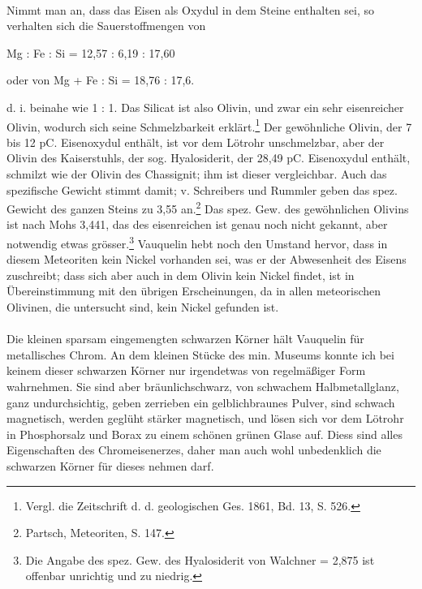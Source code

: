\documentclass[a4paper, 11pt, oneside]{article}
\begin{document}
\paragraph{}
Nimmt man an, dass das Eisen als Oxydul in dem Steine enthalten sei, so verhalten sich die Sauerstoffmengen von
\begin{center}
Mg : Fe : Si = 12,57 : 6,19 : 17,60 
\end{center}
\begin{center}
oder von Mg + Fe : Si = 18,76 : 17,6.
\end{center}
d. i. beinahe wie 1 : 1. Das Silicat ist also Olivin, und zwar ein sehr eisenreicher Olivin, wodurch sich seine Schmelzbarkeit erklärt.\footnote{Vergl. die Zeitschrift d. d. geologischen Ges. 1861, Bd. 13, S. 526.} Der gewöhnliche Olivin, der 7 bis 12 pC. Eisenoxydul enthält, ist vor dem Lötrohr unschmelzbar, aber der Olivin des Kaiserstuhls, der sog. Hyalosiderit, der 28,49 pC. Eisenoxydul enthält, schmilzt wie der Olivin des Chassignit; ihm ist dieser vergleichbar. Auch das spezifische Gewicht stimmt damit; v. Schreibers und Rummler geben das spez. Gewicht des ganzen Steins zu 3,55 an.\footnote{Partsch, Meteoriten, S. 147.} Das spez. Gew. des gewöhnlichen Olivins ist nach Mohs 3,441, das des eisenreichen ist genau noch nicht gekannt, aber notwendig etwas grösser.\footnote{Die Angabe des spez. Gew. des Hyalosiderit von Walchner = 2,875 ist offenbar unrichtig und zu niedrig.} Vauquelin hebt noch den Umstand hervor, dass in diesem Meteoriten kein Nickel vorhanden sei, was er der Abwesenheit des Eisens zuschreibt; dass sich aber auch in dem Olivin kein Nickel findet, ist in Übereinstimmung mit den übrigen Erscheinungen, da in allen meteorischen Olivinen, die untersucht sind, kein Nickel gefunden ist.
\paragraph{}
Die kleinen sparsam eingemengten schwarzen Körner hält Vauquelin für metallisches Chrom. An dem kleinen Stücke des min. Museums konnte ich bei keinem dieser schwarzen Körner nur irgendetwas von regelmäßiger Form wahrnehmen. Sie sind aber bräunlichschwarz, von schwachem Halbmetallglanz, ganz undurchsichtig, geben zerrieben ein gelblichbraunes Pulver, sind schwach magnetisch, werden geglüht stärker magnetisch, und lösen sich vor dem Lötrohr in Phosphorsalz und Borax zu einem schönen grünen Glase auf. Diess sind alles Eigenschaften des Chromeisenerzes, daher man auch wohl unbedenklich die schwarzen Körner für dieses nehmen darf.
\end{document}
